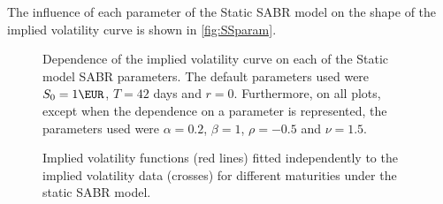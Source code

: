 The influence of each parameter of the Static SABR model on the shape of the implied volatility curve is shown in \autoref{fig:SSparam}.

\begin{figure}[H]
  \begin{subfigmatrix}{2}
  \end{subfigmatrix}
  \caption[Dependence of the implied volatility curve on each of the Static SABR model parameters.]{Dependence of the implied volatility curve on each of the Static model SABR parameters. The default parameters used were $S_0=1\EUR$, $T=42$ days and $r=0$. Furthermore, on all plots, except when the dependence on a parameter is represented, the parameters used were $\alpha=0.2$, $\beta=1$, $\rho=-0.5$ and $\nu=1.5$.}
  \label{fig:SSparam}
\end{figure}


\begin{figure}[H]
  \begin{subfigmatrix}{2}
  \end{subfigmatrix}
  \caption[Implied volatility functions fitted independently to the implied volatility data for different maturities under the static SABR model.]{Implied volatility functions (red lines) fitted independently to the implied volatility data (crosses) for different maturities under the static SABR model.}
  \label{fig:SS}
\end{figure}


